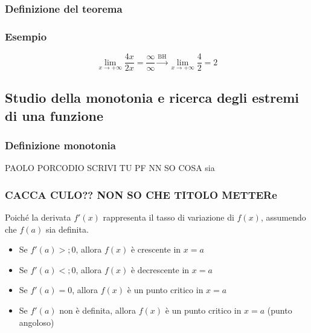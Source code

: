 \documentclass{article}
\begin{document}
\subsubsection{Definizione del teorema}


\subsubsection{Esempio}
\begin{equation*}
    \lim_{x \to +\infty} \frac{4x}{2x} = \frac{\infty}{\infty}
    \overset{\text{BH}}{\longrightarrow} \lim_{x \to +\infty} \frac{4}{2} = 2
\end{equation*}

\newpage
\subsection{Studio della monotonia e ricerca degli estremi di una funzione}
\subsubsection{Definizione monotonia}
PAOLO PORCODIO SCRIVI TU PF NN SO COSA sia

\subsubsection{CACCA CULO?? NON SO CHE TITOLO METTERe}
Poiché la derivata \(f'(x)\) rappresenta il tasso di variazione di \(f(x)\), assumendo che
\(f(a)\) sia definita.

\begin{itemize}
    \item Se \(f'(a) >; 0\), allora \(f(x)\) è crescente in \(x = a\)
    \item Se \(f'(a) <; 0\), allora \(f(x)\) è decrescente in \(x = a\)
    \item Se \(f'(a) = 0\), allora \(f(x)\) è un punto critico in \(x = a\)
    \item Se \(f'(a)\) non è definita, allora \(f(x)\) è un punto critico in \(x = a\)
    (punto angoloso)
\end{itemize}
\end{document}
